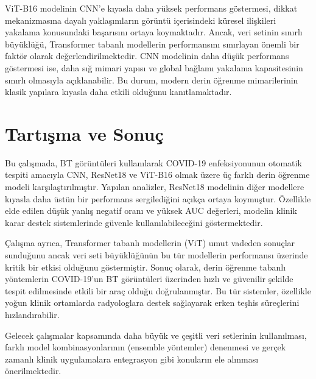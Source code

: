 \documentclass[conference]{IEEEtran}
\begin{document}
ViT-B16 modelinin CNN'e kıyasla daha yüksek performans göstermesi, dikkat mekanizmasına dayalı yaklaşımların görüntü içerisindeki küresel ilişkileri yakalama konusundaki başarısını ortaya koymaktadır. Ancak, veri setinin sınırlı büyüklüğü, Transformer tabanlı modellerin performansını sınırlayan önemli bir faktör olarak değerlendirilmektedir. CNN modelinin daha düşük performans göstermesi ise, daha sığ mimari yapısı ve global bağlamı yakalama kapasitesinin sınırlı olmasıyla açıklanabilir. Bu durum, modern derin öğrenme mimarilerinin klasik yapılara kıyasla daha etkili olduğunu kanıtlamaktadır.

\section*{Tartışma ve Sonuç}
Bu çalışmada, BT görüntüleri kullanılarak COVID-19 enfeksiyonunun otomatik tespiti amacıyla CNN, ResNet18 ve ViT-B16 olmak üzere üç farklı derin öğrenme modeli karşılaştırılmıştır. Yapılan analizler, ResNet18 modelinin diğer modellere kıyasla daha üstün bir performans sergilediğini açıkça ortaya koymuştur. Özellikle elde edilen düşük yanlış negatif oranı ve yüksek AUC değerleri, modelin klinik karar destek sistemlerinde güvenle kullanılabileceğini göstermektedir. 

Çalışma ayrıca, Transformer tabanlı modellerin (ViT) umut vadeden sonuçlar sunduğunu ancak veri seti büyüklüğünün bu tür modellerin performansı üzerinde kritik bir etkisi olduğunu göstermiştir. Sonuç olarak, derin öğrenme tabanlı yöntemlerin COVID-19'un BT görüntüleri üzerinden hızlı ve güvenilir şekilde tespit edilmesinde etkili bir araç olduğu doğrulanmıştır. Bu tür sistemler, özellikle yoğun klinik ortamlarda radyologlara destek sağlayarak erken teşhis süreçlerini hızlandırabilir. 

Gelecek çalışmalar kapsamında daha büyük ve çeşitli veri setlerinin kullanılması, farklı model kombinasyonlarının (ensemble yöntemler) denenmesi ve gerçek zamanlı klinik uygulamalara entegrasyon gibi konuların ele alınması önerilmektedir.
\end{document}
